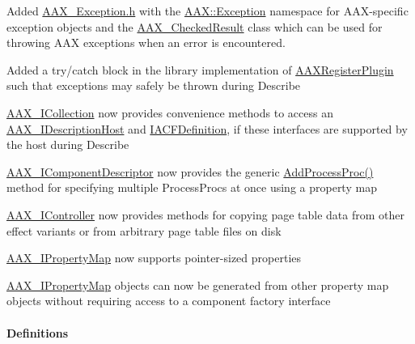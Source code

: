 \begin{DoxyItemize}
\item Added \hyperlink{a00208}{A\+A\+X\+\_\+\+Exception.\+h} with the \hyperlink{a00320}{A\+A\+X\+::\+Exception} namespace for A\+A\+X-\/specific exception objects and the \hyperlink{a00019}{A\+A\+X\+\_\+\+Checked\+Result} class which can be used for throwing A\+A\+X exceptions when an error is encountered.  
\item Added a try/catch block in the library implementation of \hyperlink{a00326_ga83d05333118598c179ca6d89487fa203}{A\+A\+X\+Register\+Plugin} such that exceptions may safely be thrown during Describe  
\item \hyperlink{a00087}{A\+A\+X\+\_\+\+I\+Collection} now provides convenience methods to access an \hyperlink{a00091}{A\+A\+X\+\_\+\+I\+Description\+Host} and \hyperlink{a00145}{I\+A\+C\+F\+Definition}, if these interfaces are supported by the host during Describe  
\item \hyperlink{a00088}{A\+A\+X\+\_\+\+I\+Component\+Descriptor} now provides the generic \hyperlink{a00088_a0e8f6217d0f317c728b3e30f15f181d2}{Add\+Process\+Proc()} method for specifying multiple Process\+Procs at once using a property map  
\item \hyperlink{a00090}{A\+A\+X\+\_\+\+I\+Controller} now provides methods for copying page table data from other effect variants or from arbitrary page table files on disk  
\item \hyperlink{a00112}{A\+A\+X\+\_\+\+I\+Property\+Map} now supports pointer-\/sized properties  
\item \hyperlink{a00112}{A\+A\+X\+\_\+\+I\+Property\+Map} objects can now be generated from other property map objects without requiring access to a component factory interface  
\end{DoxyItemize}\hypertarget{a00375_aax_sdk_2p3p0_Definitions}{}\paragraph{Definitions}\label{a00375_aax_sdk_2p3p0_Definitions}

